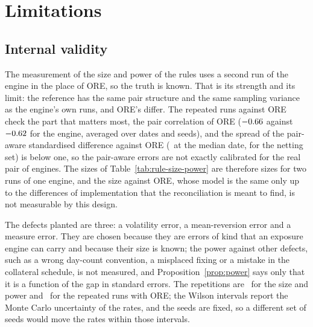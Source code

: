 \section{Limitations}
\label{sec:limitations}

\subsection{Internal validity}
\label{sec:limits-internal}

The measurement of the size and power of the rules uses a second run of the engine in the place of ORE, so the truth is known. That is its strength and its limit: the reference has the same pair structure and the same sampling variance as the engine's own runs, and ORE's differ. The repeated runs against ORE check the part that matters most, the pair correlation of ORE ($-0.66$ against $-0.62$ for the engine, averaged over dates and seeds), and the spread of the pair-aware standardised difference against ORE (\nSdPairOre\ at the median date, for the netting set) is below one, so the pair-aware errors are not exactly calibrated for the real pair of engines. The sizes of Table~\ref{tab:rule-size-power} are therefore sizes for two runs of one engine, and the size against ORE, whose model is the same only up to the differences of implementation that the reconciliation is meant to find, is not measurable by this design.

The defects planted are three: a volatility error, a mean-reversion error and a measure error. They are chosen because they are errors of kind that an exposure engine can carry and because their size is known; the power against other defects, such as a wrong day-count convention, a misplaced fixing or a mistake in the collateral schedule, is not measured, and Proposition~\ref{prop:power} says only that it is a function of the gap in standard errors. The repetitions are \nCritReps\ for the size and power and \nOreRepsNet\ for the repeated runs with ORE; the Wilson intervals report the Monte Carlo uncertainty of the rates, and the seeds are fixed, so a different set of seeds would move the rates within those intervals.

